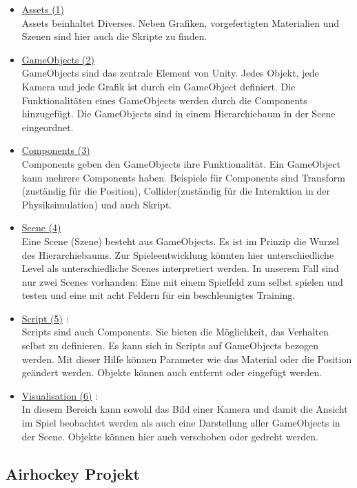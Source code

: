 \begin{itemize}
\item \underline{Assets (1)} \\
Assets beinhaltet Diverses. Neben Grafiken, vorgefertigten Materialien und Szenen sind hier auch die Skripte zu finden.

\item \underline{GameObjects (2)} \\
GameObjects sind das zentrale Element von Unity. Jedes Objekt, jede Kamera und jede Grafik ist durch ein GameObject definiert. Die Funktionalitäten eines GameObjects werden durch die Components hinzugefügt. Die GameObjects sind in einem Hierarchiebaum in der Scene eingeordnet.

\item \underline{Components (3)} \\
Components geben den GameObjects ihre Funktionalität. Ein GameObject kann mehrere Components haben. Beispiele für Components sind Transform (zuständig für die Position), Collider(zuständig für die Interaktion in der Physiksimulation) und auch Skript.

\item \underline{Scene (4)} \\
Eine Scene (Szene) besteht aus GameObjects. Es ist im Prinzip die Wurzel des Hierarchiebaums. Zur Spieleentwicklung könnten hier unterschiedliche Level als unterschiedliche Scenes interpretiert werden. In unserem Fall sind nur zwei Scenes vorhanden: Eine mit einem Spielfeld zum selbst spielen und testen und eine mit acht Feldern für ein beschleunigtes Training.

\item \underline{Script (5)} :\\
Scripts sind auch Components. Sie bieten die Möglichkeit, das Verhalten selbst zu definieren. Es kann sich in Scripts auf GameObjects bezogen werden. Mit dieser Hilfe können Parameter wie das Material oder die Position geändert werden. Objekte können auch entfernt oder eingefügt werden.

\item \underline{Visualisation (6)} :\\
In diesem Bereich kann sowohl das Bild einer Kamera und  damit die Ansicht im Spiel beobachtet werden als auch eine Darstellung aller GameObjects in der Scene. Objekte können hier auch verschoben oder gedreht werden.
\end{itemize}

\subsection{Airhockey Projekt}
\label{subsect:Airhockey Projekt}

